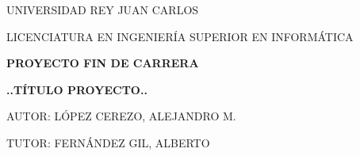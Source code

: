 

\thispagestyle{empty} %

\begin{center}
	
	\vspace*{1.5cm}
	UNIVERSIDAD REY JUAN CARLOS
	\vspace{1cm}
	
	LICENCIATURA EN INGENIERÍA SUPERIOR EN INFORMÁTICA
	\vspace{1cm}

	\begin{figure}[h] %
		\centering
	\end{figure}

	\vspace{1cm}
	{\large \bfseries PROYECTO FIN DE CARRERA}
	\vspace{3.5cm}

	{\Large \bfseries ..TÍTULO PROYECTO..}
	\vspace{3.5cm}

	AUTOR: LÓPEZ CEREZO, ALEJANDRO M.
	\vspace{0.5cm}
	
	TUTOR: FERNÁNDEZ GIL, ALBERTO
	\vspace{1.5cm}
	
\end{center}